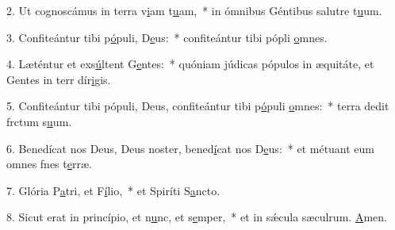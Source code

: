 2. Ut cognoscámus in terra v\uline{i}am t\uline{u}am,~* in ómnibus Géntibus salutre t\uline{u}um.\par 
3. Confiteántur tibi p\uline{ó}puli, D\uline{e}us:~* confiteántur tibi pópli \uline{o}mnes.\par 
4. Læténtur et exs\uline{ú}ltent G\uline{e}ntes:~* quóniam júdicas pópulos in æquitáte, et Gentes in terr dír\uline{i}gis.\par 
5. Confiteántur tibi pópuli, Deus, confiteántur tibi p\uline{ó}puli \uline{o}mnes:~* terra dedit frctum s\uline{u}um.\par 
6. Benedícat nos Deus, Deus noster, bened\uline{í}cat nos D\uline{e}us:~* et métuant eum omnes fnes t\uline{e}rræ.\par 
7. Glória P\uline{a}tri, et F\uline{í}lio,~* et Spiríti S\uline{a}ncto.\par 
8. Sicut erat in princípio, et n\uline{u}nc, et s\uline{e}mper,~* et in sǽcula sæculrum. \uline{A}men.\par 
